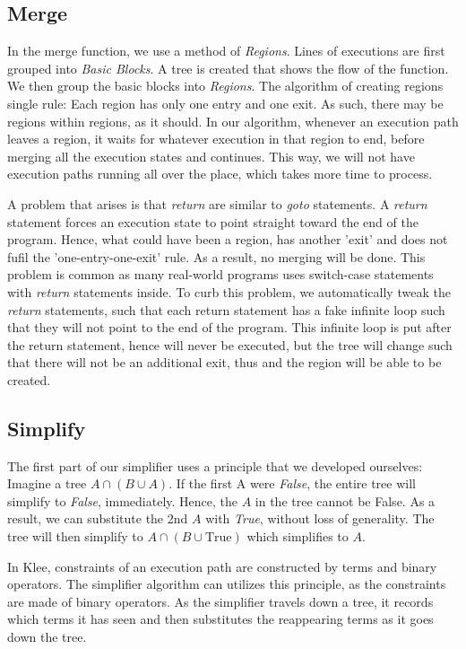 \documentclass[12pt,a4paper]{article}
\begin{document}
\subsection{Merge}
In the merge function, we use a method of \emph{Regions}. Lines of executions are first grouped into \emph{Basic Blocks}. A tree is created that shows the flow of the function. We then group the basic blocks into \emph{Regions}. The algorithm of creating regions single rule: Each region has only one entry and one exit. As such, there may be regions within regions, as it should. In our algorithm, whenever an execution path leaves a region, it waits for whatever execution in that region to end, before merging all the execution states and continues. This way, we will not have execution paths running all over the place, which takes more time to process.

A problem that arises is that \emph{return} are similar to \emph{goto} statements. A \emph{return} statement forces an execution state to point straight toward the end of the program. Hence, what could have been a region, has another 'exit' and does not fufil the 'one-entry-one-exit' rule. As a result, no merging will be done. This problem is common as many real-world programs uses switch-case statements with \emph{return} statements inside. To curb this problem, we automatically tweak the \emph{return} statements, such that each return statement has a fake infinite loop such that they will not point to the end of the program. This infinite loop is put after the return statement, hence will never be executed, but the tree will change such that there will not be an additional exit, thus and the region will be able to be created.

\subsection{Simplify}
The first part of our simplifier uses a principle that we developed ourselves:
Imagine a tree $A\cap(B\cup A)$. If the first A were \emph{False}, the entire tree will simplify to \emph{False}, immediately. Hence, the $A$ in the tree cannot be False. As a result, we can substitute the 2nd $A$ with \emph{True}, without loss of generality. The tree will then simplify to $A\cap(B\cup \text{True})$ which simplifies to $A$.

In Klee, constraints of an execution path are constructed by terms and binary operators. The simplifier algorithm can utilizes this principle, as the constraints are made of binary operators. As the simplifier travels down a tree, it records which terms it has seen and then substitutes the reappearing terms as it goes down the tree.
\end{document}
